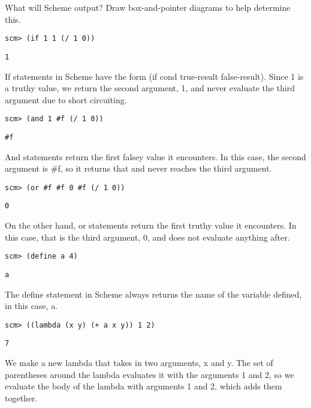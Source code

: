 \begin{blocksection}
\question What will Scheme output? Draw box-and-pointer diagrams to help determine this.

\begin{lstlisting}
scm> (if 1 1 (/ 1 0))
\end{lstlisting}
\begin{solution}[0.25in]
\begin{lstlisting}
1
\end{lstlisting}
If statements in Scheme have the form (if cond true-result false-result). Since 1 is a truthy value, we return the second argument, 1, and never evaluate the third argument due to short circuiting.
\end{solution}

\begin{lstlisting}
scm> (and 1 #f (/ 1 0))
\end{lstlisting}
\begin{solution}[0.25in]
\begin{lstlisting}
#f
\end{lstlisting}
And statements return the first falsey value it encounters. In this case, the second argument is \#f, so it returns that and never reaches the third argument.
\end{solution}

\begin{lstlisting}
scm> (or #f #f 0 #f (/ 1 0))
\end{lstlisting}
\begin{solution}[0.25in]
\begin{lstlisting}
0
\end{lstlisting}
On the other hand, or statements return the first truthy value it encounters. In this case, that is the third argument, 0, and does not evaluate anything after.
\end{solution}

\begin{lstlisting}
scm> (define a 4)
\end{lstlisting}
\begin{solution}[0.25in]
\begin{lstlisting}
a
\end{lstlisting}
The define statement in Scheme always returns the name of the variable defined, in this case, a.
\end{solution}

\begin{lstlisting}
scm> ((lambda (x y) (+ a x y)) 1 2)
\end{lstlisting}
\begin{solution}[0.25in]
\begin{lstlisting}
7
\end{lstlisting}
We make a new lambda that takes in two arguments, x and y. The set of parentheses around the lambda evaluates it with the arguments 1 and 2, so we evaluate the body of the lambda with arguments 1 and 2, which adds them together.
\end{solution}


\end{blocksection}
